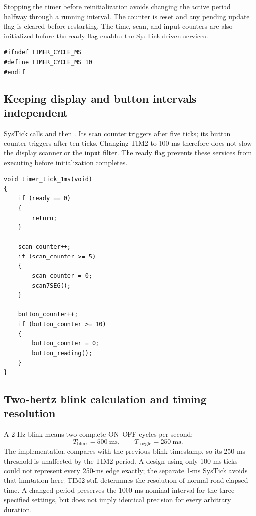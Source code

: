 \documentclass[a4paper]{article}
\newcommand{\code}[1]{\texttt{\detokenize{#1}}}
\newcommand{\topic}[1]{\subsection{#1}}
\begin{document}
Stopping the timer before reinitialization avoids changing the active period
halfway through a running interval. The counter is reset and any pending update
flag is cleared before restarting. The time, scan, and input counters are also
initialized before the ready flag enables the SysTick-driven services.

\par\noindent\begin{minipage}{\linewidth}
\begin{lstlisting}[caption={Single application period selection in the timer header}]
#ifndef TIMER_CYCLE_MS
#define TIMER_CYCLE_MS 10
#endif
\end{lstlisting}
\end{minipage}\par

\topic{Keeping display and button intervals independent}
SysTick calls \code{HAL_IncTick()} and then \code{timer_tick_1ms()}.
Its scan counter triggers after five ticks; its button counter triggers after
ten ticks. Changing TIM2 to 100 ms therefore does not slow the display scanner
or the input filter. The ready flag prevents these services from executing
before initialization completes.

\par\noindent\begin{minipage}{\linewidth}
\begin{lstlisting}[caption={One-millisecond service scheduling}]
void timer_tick_1ms(void)
{
    if (ready == 0)
    {
        return;
    }

    scan_counter++;
    if (scan_counter >= 5)
    {
        scan_counter = 0;
        scan7SEG();
    }

    button_counter++;
    if (button_counter >= 10)
    {
        button_counter = 0;
        button_reading();
    }
}
\end{lstlisting}
\end{minipage}\par

\topic{Two-hertz blink calculation and timing resolution}
A 2-Hz blink means two complete ON--OFF cycles per second:
\[
T_{\mathrm{blink}}=500\ \mathrm{ms},\qquad
T_{\mathrm{toggle}}=250\ \mathrm{ms}.
\]
The implementation compares \code{HAL_GetTick()} with the previous blink
timestamp, so its 250-ms threshold is unaffected by the TIM2 period.
A design using only 100-ms ticks could not represent every 250-ms edge
exactly; the separate 1-ms SysTick avoids that limitation here.
TIM2 still determines the resolution of normal-road elapsed time. A changed
period preserves the 1000-ms nominal interval for the three specified settings,
but does not imply identical precision for every arbitrary duration.
\end{document}
